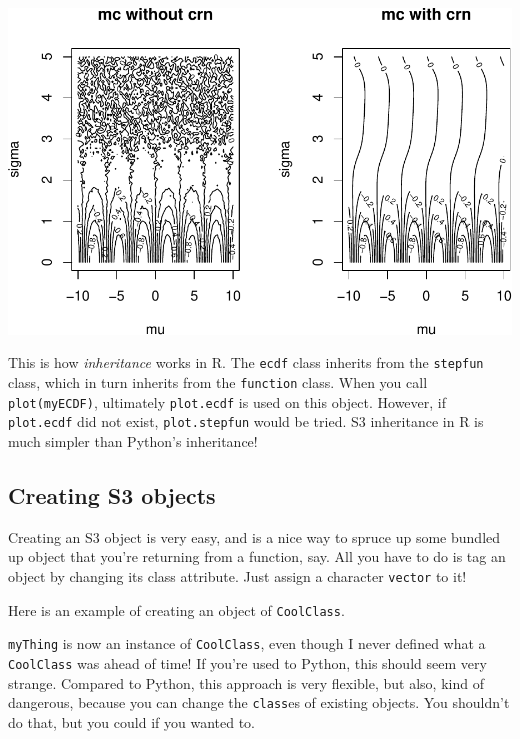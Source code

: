 \documentclass[
  12pt,
  krantz2]{krantz}
\makeatletter
\newenvironment{Shaded}{\begin{snugshade}}{\end{snugshade}}
\newcommand{\CommentTok}[1]{\textcolor[rgb]{0.37,0.37,0.37}{\textit{#1}}}
\newcommand{\DecValTok}[1]{\textcolor[rgb]{0.06,0.06,0.06}{#1}}
\newcommand{\DocumentationTok}[1]{\textcolor[rgb]{0.37,0.37,0.37}{\textbf{\textit{#1}}}}
\newcommand{\FunctionTok}[1]{\textcolor[rgb]{0,0,0}{#1}}
\newcommand{\NormalTok}[1]{#1}
\newcommand{\OtherTok}[1]{\textcolor[rgb]{0.37,0.37,0.37}{#1}}
\newcommand{\SpecialCharTok}[1]{\textcolor[rgb]{0,0,0}{#1}}
\newcommand{\StringTok}[1]{\textcolor[rgb]{0.5,0.5,0.5}{#1}}
\newenvironment{kframe}{%
\medskip{}
\setlength{\fboxsep}{.8em}
 \def\at@end@of@kframe{}%
 \ifinner\ifhmode%
  \def\at@end@of@kframe{\end{minipage}}%
  \begin{minipage}{\columnwidth}%
 \fi\fi%
 \def\FrameCommand##1{\hskip\@totalleftmargin \hskip-\fboxsep
 \colorbox{shadecolor}{##1}\hskip-\fboxsep
     \hskip-\linewidth \hskip-\@totalleftmargin \hskip\columnwidth}%
 \MakeFramed {\advance\hsize-\width
   \@totalleftmargin\z@ \linewidth\hsize
   \@setminipage}}%
 {\par\unskip\endMakeFramed%
 \at@end@of@kframe}
\renewenvironment{Shaded}{\begin{kframe}}{\end{kframe}}
\makeatother
\begin{document}
\includegraphics[width=0.5\linewidth]{r_and_python_book_files/figure-latex/unnamed-chunk-243-1}

This is how \emph{inheritance} works in R. The \texttt{ecdf} class inherits from the \texttt{stepfun} class, which in turn inherits from the \texttt{function} class. When you call \texttt{plot(myECDF)}, ultimately \texttt{plot.ecdf} is used on this object. However, if \texttt{plot.ecdf} did not exist, \texttt{plot.stepfun} would be tried. S3 inheritance in R is much simpler than Python's inheritance!

\hypertarget{creating-s3-objects}{%
\subsection{Creating S3 objects}\label{creating-s3-objects}}

Creating an S3 object is very easy, and is a nice way to spruce up some bundled up object that you're returning from a function, say. All you have to do is tag an object by changing its class attribute. Just assign a character \texttt{vector} to it!

Here is an example of creating an object of \texttt{CoolClass}.

\begin{Shaded}
\end{Shaded}

\texttt{myThing} is now an instance of \texttt{CoolClass}, even though I never defined what a \texttt{CoolClass} was ahead of time! If you're used to Python, this should seem very strange. Compared to Python, this approach is very flexible, but also, kind of dangerous, because you can change the \texttt{class}es of existing objects. You shouldn't do that, but you could if you wanted to.
\end{document}
